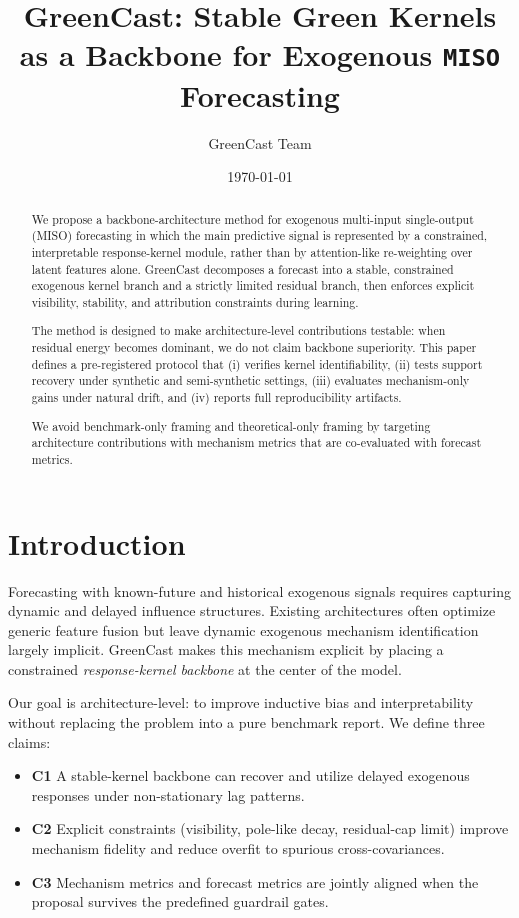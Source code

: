 \documentclass[11pt]{article}
\title{GreenCast: Stable Green Kernels as a Backbone for Exogenous \texttt{MISO} Forecasting}
\author{GreenCast Team}
\date{\today}
\begin{document}
\maketitle

\begin{abstract}
We propose a backbone-architecture method for exogenous multi-input single-output (MISO) forecasting in which the main predictive signal is represented by a constrained, interpretable response-kernel module, rather than by attention-like re-weighting over latent features alone. GreenCast decomposes a forecast into a stable, constrained exogenous kernel branch and a strictly limited residual branch, then enforces explicit visibility, stability, and attribution constraints during learning.

The method is designed to make architecture-level contributions testable: when residual energy becomes dominant, we do not claim backbone superiority. This paper defines a pre-registered protocol that (i) verifies kernel identifiability, (ii) tests support recovery under synthetic and semi-synthetic settings, (iii) evaluates mechanism-only gains under natural drift, and (iv) reports full reproducibility artifacts.

We avoid benchmark-only framing and theoretical-only framing by targeting architecture contributions with mechanism metrics that are co-evaluated with forecast metrics.
\end{abstract}

\section{Introduction}
Forecasting with known-future and historical exogenous signals requires capturing dynamic and delayed influence structures. Existing architectures often optimize generic feature fusion but leave dynamic exogenous mechanism identification largely implicit. GreenCast makes this mechanism explicit by placing a constrained \textit{response-kernel backbone} at the center of the model.

Our goal is architecture-level: to improve inductive bias and interpretability without replacing the problem into a pure benchmark report. We define three claims:

\begin{itemize}
\item \textbf{C1} A stable-kernel backbone can recover and utilize delayed exogenous responses under non-stationary lag patterns.
\item \textbf{C2} Explicit constraints (visibility, pole-like decay, residual-cap limit) improve mechanism fidelity and reduce overfit to spurious cross-covariances.
\item \textbf{C3} Mechanism metrics and forecast metrics are jointly aligned when the proposal survives the predefined guardrail gates.
\end{itemize}
\end{document}
